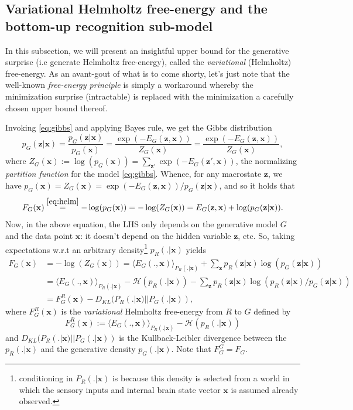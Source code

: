 \documentclass[10pt,letterpaper]{article}
\def\z{\mathbf{z}}
\def\x{\mathbf{x}}
\begin{document}
\subsection{Variational Helmholtz free-energy and the bottom-up recognition sub-model}
In this subsection, we will present an insightful upper bound for the generative surprise (i.e generate Helmholtz free-energy), called the \textit{variational} (Helmholtz) free-energy. As an avant-gout of what is to come shorty, let's just note that the well-known \textit{free-energy principle} is simply a workaround whereby the minimization surprise (intractable) is replaced with the  minimization a carefully chosen upper bound thereof.

Invoking \eqref{eq:gibbs} and applying Bayes rule, we get the Gibbs
distribution
\begin{equation}
  p_G(\z|\x) = \frac{p_G(\z|\x)}{p_G(\x)} = \frac{\exp(-E_G(\z, \x))}{Z_G(\x)} = \frac{\exp(-E_G(\z, \x))}{Z_G(\x)},
\end{equation}
where $Z_G(\x) := \log(p_G(\x)) = \sum_{\z'}\exp(-E_G(\z',\x))$, the normalizing \textit{partition function} for the model \ref{eq:gibbs}.
Whence, for any macrostate $\z$, we have $p_G(\x) = Z_G(\x) = \exp(-E_G(\z, \x)) / p_G(\z|\x)$, and so it holds that
\begin{equation}
F_G(\x)\overset{\eqref{eq:helm}}{=} -\log(p_G(\x)) = -\log(Z_G(\x)) = E_G(\z, \x) + \log(p_G(\z|\x)).
\end{equation}
Now, in the above equation, the LHS only depends on the generative model $G$ and the data point $\x$:
it doesn't depend on the hidden variable $\z$, etc. So, taking expectations w.r.t an arbitrary
density\footnote{conditioning in $P_R(.|\x)$ is because this density is selected from a world in which the sensory inputs and internal brain
  state vector $\x$ is assumed already observed.} $p_R(.|\x)$ yields
\begin{equation}
  \begin{split}
    F_G(\x) &= -\log(Z_G(\x)) = \langle E_G(., \x)\rangle_{P_R(.|\x)} + \sum_{\z}p_R(\z|\x)\log(p_G(\z|\x))\\
    &= \langle E_G(., \x)\rangle_{P_R(.|\x)} - \mathcal H(p_R(.|\x)) - \sum_{\z}p_R(\z|\x)\log(p_R(\z|\x)/p_G(\z|\x))\\
    &= F^R_G(\x) - D_{KL}(P_R(.|\x) || P_G(.|\x)),
  \end{split}
  \label{eq:fe}
\end{equation}
where $F^R_G(\x)$ is the \textit{variational} Helmholtz free-energy from $R$ to $G$ defined by
\begin{equation}
  F^R_G(\x) := \langle E_G(., \x)\rangle_{P_R(.|\x)} - \mathcal H(p_R(.|\x))
\end{equation}
and $D_{KL}(P_R(.|\x) || P_G(.|\x))$ is the Kullback-Leibler divergence between the $p_R(.|\x)$ and the generative density $p_G(.|\x)$. Note that $F^G_G = F_G$.
\end{document}

